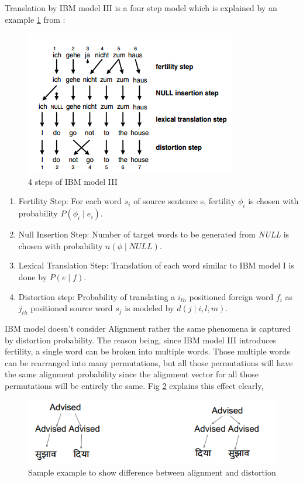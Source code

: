 Translation by IBM model III is a four step model which is explained by an example \ref{fig:4steps} from \cite{koehn}:
\begin{figure}[H]
        \centering
        \includegraphics[scale=0.6]{Images/4steps}
        \caption{4 steps of IBM model III}
        \label{fig:4steps}
\end{figure}
\begin{enumerate}
\item Fertility Step: For each word $s_{i}$ of source sentence s, fertility $\phi_{i}$ is chosen with probability $P(\phi_{i}\mid e_{i})$.
\item Null Insertion Step: Number of target words to be generated from \textit{NULL} is chosen with probability $n(\phi \mid NULL)$.
\item Lexical Translation Step: Translation of each word similar to IBM model I is done by $P(e\mid f)$.
\item Distortion step: Probability of translating a $i_{th}$ positioned foreign word $f_{i}$ as $j_{th}$ positioned source word $s_{j}$ is modeled by $d(j\mid i,l,m)$.
\end{enumerate}

IBM model doesn't consider Alignment rather the same phenomena is captured by distortion probability. The reason being, since IBM model III introduces fertility, a single word can be broken into multiple words. Those multiple words can be rearranged into many permutations, but all those permutations will have the same alignment probability since the alignment vector for all those permutations will be entirely the same. Fig \ref{fig:distortion} explains this effect clearly,
\begin{figure}[H]
        \centering
        \includegraphics[scale=0.6]{Images/distortion}
        \caption{Sample example to show difference between alignment and distortion}
        \label{fig:distortion}
\end{figure}

